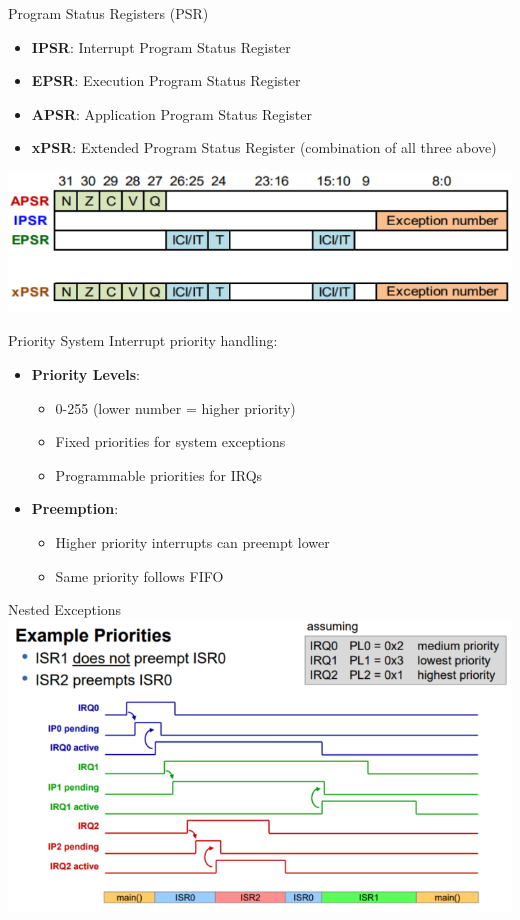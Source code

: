 \begin{definition}{Program Status Registers (PSR)}
  \begin{itemize}
    \item \textbf{IPSR}: Interrupt Program Status Register
    \item \textbf{EPSR}: Execution Program Status Register
    \item \textbf{APSR}: Application Program Status Register
    \item \textbf{xPSR}: Extended Program Status Register (combination of all three above)
  \end{itemize}
  \includegraphics[width=\linewidth]{images/psrs.png}
\end{definition}

\begin{concept}{Priority System}
Interrupt priority handling:
\begin{itemize}
  \item \textbf{Priority Levels}:
    \begin{itemize}
      \item 0-255 (lower number = higher priority)
      \item Fixed priorities for system exceptions
      \item Programmable priorities for IRQs
    \end{itemize}
  \item \textbf{Preemption}:
    \begin{itemize}
      \item Higher priority interrupts can preempt lower
      \item Same priority follows FIFO
    \end{itemize}
\end{itemize}
\end{concept}

\begin{definition}{Nested Exceptions}\\
\includegraphics[width=\linewidth]{images/nested_exceptions.png}  
\end{definition}

